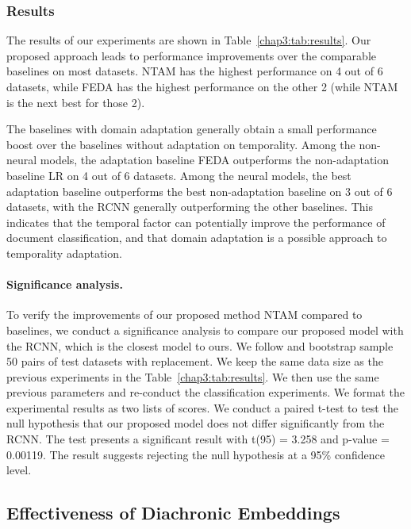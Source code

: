\subsubsection{Results}
\label{chap3:sec:results}


The results of our experiments are shown in Table~\ref{chap3:tab:results}. 
Our proposed approach leads to performance improvements over the comparable baselines on most datasets.
NTAM has the highest performance on 4 out of 6 datasets, while FEDA has the highest performance on the other 2 (while NTAM is the next best for those 2).


The baselines with domain adaptation generally obtain a small performance boost over the baselines without adaptation on temporality. 
Among the non-neural models, the adaptation baseline FEDA outperforms the non-adaptation baseline LR on 4 out of 6 datasets. 
Among the neural models, the best adaptation baseline outperforms the best non-adaptation baseline on 3 out of 6 datasets,
with the RCNN generally outperforming the other baselines.
This indicates that the temporal factor can potentially improve the performance of document classification, and that domain adaptation is a possible approach to temporality adaptation. 

\paragraph{Significance analysis.} 
To verify the improvements of our proposed method NTAM compared to baselines, we conduct a significance analysis to compare our proposed model with the RCNN, which is the closest model to ours. We follow \cite{berg2012empirical} and bootstrap sample 50 pairs of test datasets with replacement. We keep the same data size as the previous experiments in the Table~\ref{chap3:tab:results}. We then use the same previous parameters and re-conduct the classification experiments. We format the experimental results as two lists of scores. We conduct a paired t-test to test the null hypothesis that our proposed model does not differ significantly from the RCNN. The test presents a significant result with t(95) = 3.258 and p-value = 0.00119. The result suggests rejecting the null hypothesis at a 95\% confidence level.


\subsection{Effectiveness of Diachronic Embeddings}

